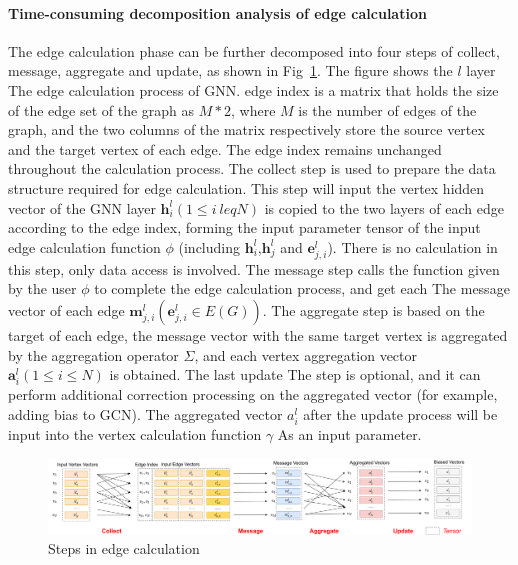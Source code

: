 \paragraph{Time-consuming decomposition analysis of edge calculation}
The edge calculation phase can be further decomposed into four steps of collect, message, aggregate and update,
as shown in Fig~\ref{fig:steps_in_edge_calculation}. The figure shows the $l$ layer The edge calculation process of GNN.
edge index is a matrix that holds the size of the edge set of the graph as $M*2$, where $M$ is the number of edges of the graph,
and the two columns of the matrix respectively store the source vertex and the target vertex of each edge.
The edge index remains unchanged throughout the calculation process.
The collect step is used to prepare the data structure required for edge calculation.
This step will input the vertex hidden vector of the GNN layer $\boldsymbol{h}_i^l (1 \leq i \ leq N)$
is copied to the two layers of each edge according to the edge index, forming the input parameter tensor of the input edge calculation function $\phi$
(including $\boldsymbol{h}_i^l$,$\boldsymbol{h}_j^ l$ and $\boldsymbol{e}_{j, i}^l$).
There is no calculation in this step, only data access is involved. The message step calls the function given by the user $\phi$ to
complete the edge calculation process, and get each The message vector of each edge $\boldsymbol{m}_{j, i}^l (\boldsymbol{e}_{j, i}^l \in E(G))$.
The aggregate step is based on the target of each edge, the message vector with the same target vertex is aggregated by the aggregation operator $\Sigma$,
and each vertex aggregation vector $\boldsymbol{a}_i^l (1 \leq i \leq N)$ is obtained. 
The last update The step is optional, and it can perform additional correction processing on the aggregated vector (for example, adding bias to GCN).
The aggregated vector $a_i^l$ after the update process will be input into the vertex calculation function $\gamma$ As an input parameter.

\begin{figure}
    \centering
    \includegraphics[width=0.7\columnwidth]{figs/illustration/steps_in_edge_calculation.png}
    \caption{Steps in edge calculation}
    \label{fig:steps_in_edge_calculation}
\end{figure}


